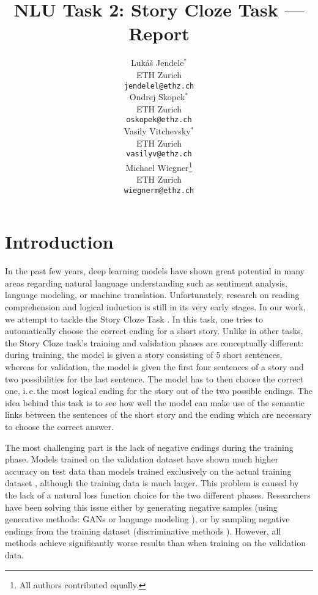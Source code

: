 \documentclass{article}
\title{NLU Task 2: Story Cloze Task --- Report}
\author{
  Luk\'{a}\v{s} Jendele$^\ast$\\
  ETH Zurich\\
  \texttt{jendelel@ethz.ch}\\
  \And
  Ondrej Skopek$^\ast$\\
  ETH Zurich\\
  \texttt{oskopek@ethz.ch}\\
  \And
  Vasily Vitchevsky$^\ast$\\
  ETH Zurich\\
  \texttt{vasilyv@ethz.ch}\\
  \And
  Michael Wiegner\thanks{All authors contributed equally.}\\
  ETH Zurich\\
  \texttt{wiegnerm@ethz.ch}\\
}
\begin{document}
\maketitle


\section{Introduction}\label{sec:intro}
In the past few years, deep learning models have shown great potential in many areas regarding natural language understanding such as sentiment analysis, language modeling, or machine translation. Unfortunately, research on reading comprehension and logical induction is still in its very early stages. In our work, we attempt to tackle the Story Cloze Task \citep{Mostafazadeh2016AStories}. In this task, one tries to automatically choose the correct ending for a short story. Unlike in other tasks, the Story Cloze task's training and validation phases are conceptually different: during training, the model is given a story consisting of 5 short sentences, whereas for validation, the model is given the first four sentences of a story and two possibilities for the last sentence. The model has to then choose the correct one, i.\,e.\,the most logical ending for the story out of the two possible endings. The idea behind this task is to see how well the model can make use of the semantic links between the sentences of the short story and the ending which are necessary to choose the correct answer.

The most challenging part is the lack of negative endings during the training phase. Models trained on the validation dataset \citep{Srinivasan2018ATest,Roemmele2017AnTest} have shown much higher accuracy on test data than models trained exclusively on the actual training dataset \citep{Roemmele2017AnTest,Wang2017ConditionalComprehension}, although the training data is much larger. This problem is caused by the lack of a natural loss function choice for the two different phases. Researchers have been solving this issue either by generating negative samples (using generative methods: GANs \citep{Wang2017ConditionalComprehension} or language modeling \citep{Roemmele2017AnTest}), or by sampling negative endings from the training dataset (discriminative methods \citep{Roemmele2017AnTest}). However, all methods achieve significantly worse results than when training on the validation data.
\end{document}
